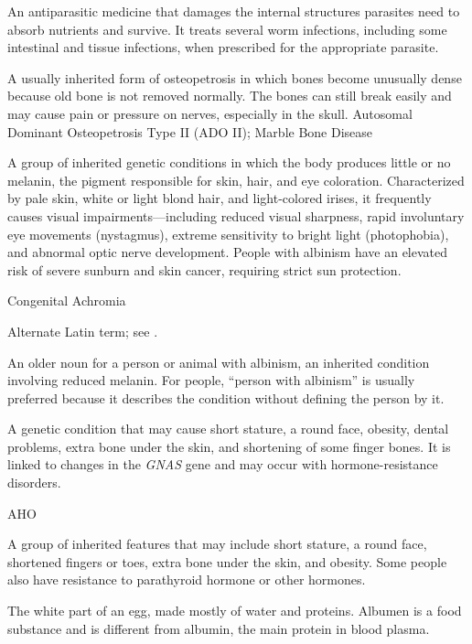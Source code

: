  An antiparasitic medicine that damages the internal structures parasites need to absorb nutrients and survive. It treats several worm infections, including some intestinal and tissue infections, when prescribed for the appropriate parasite.

 A usually inherited form of osteopetrosis in which bones become unusually dense because old bone is not removed normally. The bones can still break easily and may cause pain or pressure on nerves, especially in the skull.
\synonyms
Autosomal Dominant Osteopetrosis Type II (ADO II); Marble Bone Disease

 A group of inherited genetic conditions in which the body produces little or no melanin, the pigment responsible for skin, hair, and eye coloration. Characterized by pale skin, white or light blond hair, and light-colored irises, it frequently causes visual impairments—including reduced visual sharpness, rapid involuntary eye movements (nystagmus), extreme sensitivity to bright light (photophobia), and abnormal optic nerve development. People with albinism have an elevated risk of severe sunburn and skin cancer, requiring strict sun protection.

\synonyms
Congenital Achromia

 Alternate Latin term; see .

 An older noun for a person or animal with albinism, an inherited condition involving reduced melanin. For people, “person with albinism” is usually preferred because it describes the condition without defining the person by it.

 A genetic condition that may cause short stature, a round face, obesity, dental problems, extra bone under the skin, and shortening of some finger bones. It is linked to changes in the \textit{GNAS} gene and may occur with hormone-resistance disorders.

\synonyms
AHO

 A group of inherited features that may include short stature, a round face, shortened fingers or toes, extra bone under the skin, and obesity. Some people also have resistance to parathyroid hormone or other hormones.

 The white part of an egg, made mostly of water and proteins. Albumen is a food substance and is different from albumin, the main protein in blood plasma.

